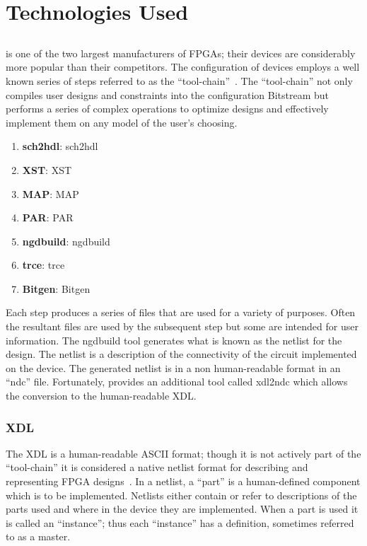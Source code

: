 \label{chapter:appendix}

\section{Technologies Used}
\subsection{\Xilinx}
\Xilinx is one of the two largest manufacturers of \acrshort{FPGA}s; their devices are considerably more popular than their competitors.
The configuration of devices employs a well known series of steps referred to as the \Xilinx ``tool-chain''~\cite{xilnxDevManual}.
The ``tool-chain'' not only compiles user designs and constraints into the configuration \gls{Bitstream} but performs a series of complex operations to optimize designs and effectively implement them on any \Xilinx model of the user's choosing.
\begin{enumerate}
	\item \textbf{\gls{sch2hdl}}: \glsdesc{sch2hdl}
	\item \textbf{\gls{XST}}: \glsdesc{XST}
	\item \textbf{\gls{MAP}}: \glsdesc{MAP}
	\item \textbf{\gls{PAR}}: \glsdesc{PAR}
	\item \textbf{\gls{ngdbuild}}: \glsdesc{ngdbuild}
	\item \textbf{\gls{trce}}: \glsdesc{trce}
	\item \textbf{\gls{Bitgen}}: \glsdesc{Bitgen}
\end{enumerate}
Each step produces a series of files that are used for a variety of purposes. 
Often the resultant files are used by the subsequent step but some are intended for user information.
The \gls{ngdbuild} tool generates what is known as the netlist for the design.
The netlist is a description of the connectivity of the circuit implemented on the device. 
The generated netlist is in a non human-readable format in an ``ndc'' file.
Fortunately, \Xilinx provides an additional tool called \gls{xdl2ndc} which allows the conversion to the human-readable \acrfull{XDL}.
\subsubsection{\acrfull{XDL}} \label{sec:XDL}
The \acrfull{XDL} is a human-readable ASCII format; though it is not actively part of the ``tool-chain'' it is considered a native netlist format for describing and representing \acrshort{FPGA} designs~\cite{xdlTutorial}. 
In a netlist, a ``part'' is a human-defined component which is to be implemented.
Netlists either contain or refer to descriptions of the parts used and where in the device they are implemented.
When a part is used it is called an ``instance''; thus each ``instance'' has a definition, sometimes referred to as a master.

